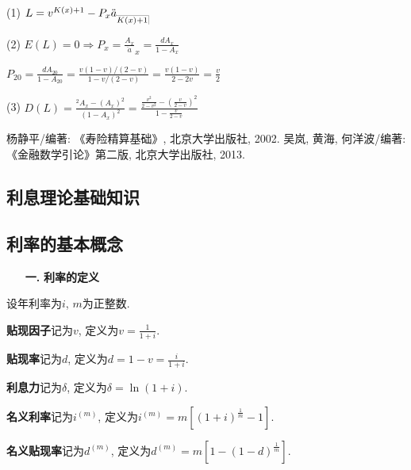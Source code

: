 \documentclass[a4paper,10pt]{ctexbook}
\makeatletter
\newcommand{\hei}{\CJKfamily{hei}}      %
\DeclareRobustCommand{\annu}[1]{_{%
    \def\arraystretch{0}%
    \setlength\arraycolsep{1pt}%
    \setlength\arrayrulewidth{.2pt}%
    \begin{array}[b]{@{}c|}\hline
        \\[\arraycolsep]%
        \scriptstyle #1%
    \end{array}%
}}
\makeatother
\begin{document}
\solution (1) $L = v^{K(x)+1}-P_x\ddot a_{\annu{K(x)+1}}$

(2) $E(L) = 0 \Rightarrow P_x = \frac{A_x}{\ddot a}_x = \frac{dA_x}{1-A_x}$

$P_{20} = \frac{dA_{20}}{1-A_{20}}
           =\frac{v(1-v)/(2-v)}{1-v/(2-v)}
           =\frac{v(1-v)}{2-2v}=\frac{v}{2}$

(3) $D(L) = \frac{{}^2A_x-(A_x)^2}{(1-A_x)^2}
        =\frac{\frac{v^2}{2-v^2}-(\frac{v}{2-v})^2}{1-\frac{v}{2-v}}$


\begin{thebibliography}{99}
    杨静平/编著: 《寿险精算基础》, 北京大学出版社, 2002.
     吴岚, 黄海, 何洋波/编著: 《金融数学引论》第二版, 北京大学出版社, 2013.

\end{thebibliography}

\mainmatter


\begin{appendix}
    \chapter{利息理论基础知识}
    \section{利率的基本概念}
    \begin{itemize}
        \item[{\bf\hei 一.}]{\bf\hei 利率的定义}
    \end{itemize}

    设年利率为$i$, $m$为正整数.

    \textbf{贴现因子}记为$v$, 定义为$v=\frac{1}{1+i}$.

    \textbf{贴现率}记为$d$, 定义为$d=1-v=\frac{i}{1+i}$.

    \textbf{利息力}记为$\delta$, 定义为$\delta=\ln(1+i)$.

    \textbf{名义利率}记为$i^{(m)}$, 定义为$i^{(m)}=m[(1+i)^{\frac{1}{m}}-1]$.

    \textbf{名义贴现率}记为$d^{(m)}$, 定义为$d^{(m)}=m[1-(1-d)^{\frac{1}{m}}]$.
\end{appendix}
\end{document}
